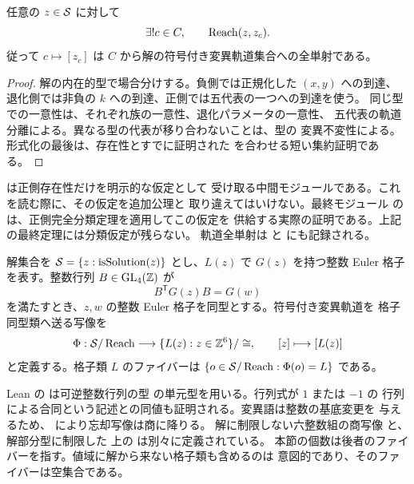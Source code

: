 \begin{theorem}[全変異軌道の一意分類]
\label{bp:full-classification}
\leanok
{}
任意の $z\in\mathcal S$ に対して
\[
 \exists! c\in C,\qquad \operatorname{Reach}(z,z_c).
\]
従って $c\mapsto[z_c]$ は $C$ から解の符号付き変異軌道集合への全単射である。
\end{theorem}
\begin{proof}
\leanok
解の内在的型で場合分けする。負側では正規化した $(x,y)$ への到達、
退化側では非負の $k$ への到達、正側では五代表の一つへの到達を使う。
同じ型での一意性は、それぞれ族の一意性、退化パラメータの一意性、
五代表の軌道分離による。異なる型の代表が移り合わないことは、型の
変異不変性による。形式化の最後は、存在性とすでに証明された
 を合わせる短い集約証明である。
\end{proof}

 は正側存在性だけを明示的な仮定として
受け取る中間モジュールである。これを読む際に、その仮定を追加公理と
取り違えてはいけない。最終モジュール  の
 は、正側完全分類定理を適用してこの仮定を
供給する実際の証明である。上記の最終定理には分類仮定が残らない。
軌道全単射は  と
 にも記録される。

\begin{definition}[解軌道から整数格子への忘却]
\label{bp:fiber-forgetful}
\leanok
{}
解集合を $\mathcal S=\{z:\operatorname{isSolution}(z)\}$ とし、$L(z)$ で $G(z)$ を持つ整数 Euler 格子を表す。整数行列
$B\in\operatorname{GL}_4(\mathbb Z)$ が
\[
 B^{\mathsf T}G(z)B=G(w)
\]
を満たすとき、$z,w$ の整数 Euler 格子を同型とする。符号付き変異軌道を
格子同型類へ送る写像を
\[
 \Phi:\mathcal S/\operatorname{Reach}\longrightarrow \{L(z):z\in\mathbb Z^6\}/\cong,
 \qquad [z]\longmapsto[L(z)]
\]
と定義する。格子類 $L$ のファイバーは
$\{o\in\mathcal S/\operatorname{Reach}:\Phi(o)=L\}$ である。
\end{definition}

Lean の  は可逆整数行列の型
 の単元型を用いる。行列式が $1$ または $-1$ の
行列による合同という記述との同値も証明される。変異語は整数の基底変更を
与えるため、 により忘却写像は商に降りる。
解に制限しない六整数組の商写像  と、解部分型に制限した
上の  は別々に定義されている。
本節の個数は後者のファイバーを指す。値域に解から来ない格子類も含めるのは
意図的であり、そのファイバーは空集合である。

